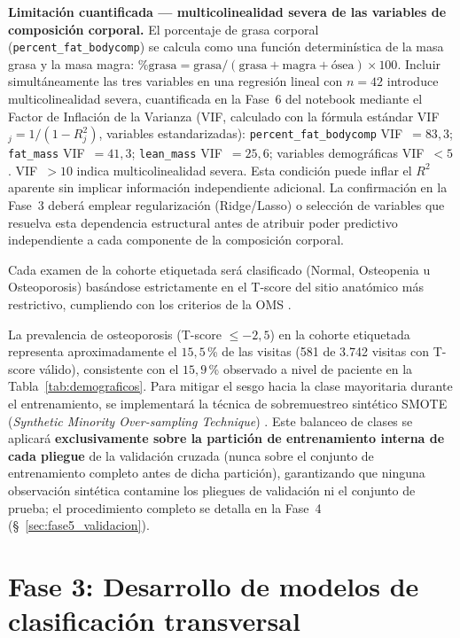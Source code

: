 \documentclass[../tesis.tex]{subfiles}
\begin{document}
\textbf{Limitación cuantificada --- multicolinealidad severa de las variables de composición corporal.} El porcentaje de grasa corporal (\texttt{percent\_fat\_bodycomp}) se calcula como una función determinística de la masa grasa y la masa magra: $\%\text{grasa} = \text{grasa} / (\text{grasa} + \text{magra} + \text{ósea}) \times 100$. Incluir simultáneamente las tres variables en una regresión lineal con $n = 42$ introduce multicolinealidad severa, cuantificada en la Fase~6 del notebook mediante el Factor de Inflación de la Varianza (VIF, calculado con la fórmula estándar VIF$_j = 1/(1-R^2_j)$, variables estandarizadas): \texttt{percent\_fat\_bodycomp} VIF~$= 83{,}3$; \texttt{fat\_mass} VIF~$= 41{,}3$; \texttt{lean\_mass} VIF~$= 25{,}6$; variables demográficas VIF~$< 5$. VIF~$> 10$ indica multicolinealidad severa. Esta condición puede inflar el $R^2$ aparente sin implicar información independiente adicional. La confirmación en la Fase~3 deberá emplear regularización (Ridge/Lasso) o selección de variables que resuelva esta dependencia estructural antes de atribuir poder predictivo independiente a cada componente de la composición corporal.

Cada examen de la cohorte etiquetada será clasificado (Normal, Osteopenia u Osteoporosis) basándose estrictamente en el T-score del sitio anatómico más restrictivo, cumpliendo con los criterios de la OMS \cite{WHO1994}.

La prevalencia de osteoporosis (T-score $\leq -2{,}5$) en la cohorte etiquetada representa aproximadamente el $15{,}5$\,\% de las visitas (581 de 3.742 visitas con T-score válido), consistente con el $15{,}9$\,\% observado a nivel de paciente en la Tabla~\ref{tab:demograficos}. Para mitigar el sesgo hacia la clase mayoritaria durante el entrenamiento, se implementará la técnica de sobremuestreo sintético SMOTE (\textit{Synthetic Minority Over-sampling Technique}) \cite{Chawla2002}. Este balanceo de clases se aplicará \textbf{exclusivamente sobre la partición de entrenamiento interna de cada pliegue} de la validación cruzada (nunca sobre el conjunto de entrenamiento completo antes de dicha partición), garantizando que ninguna observación sintética contamine los pliegues de validación ni el conjunto de prueba; el procedimiento completo se detalla en la Fase~4 (§~\ref{sec:fase5_validacion}).

\section{Fase 3: Desarrollo de modelos de clasificación transversal}
\label{sec:fase3_transversal}
\end{document}
